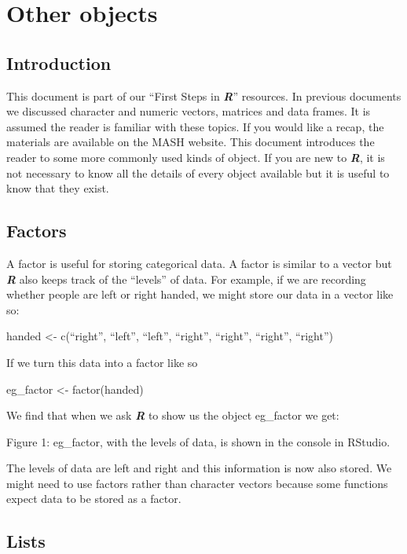 \documentclass[
]{book}
\begin{document}
\chapter{Other objects}\label{other-objects}

\section{Introduction}\label{introduction-6}

This document is part of our ``First Steps in \textbf{\emph{R}}'' resources. In previous documents we discussed character and numeric vectors, matrices and data frames. It is assumed the reader is familiar with these topics. If you would like a recap, the materials are available on the MASH website. This document introduces the reader to some more commonly used kinds of object. If you are new to \textbf{\emph{R}}, it is not necessary to know all the details of every object available but it is useful to know that they exist.

\section{Factors}\label{factors}

A factor is useful for storing categorical data. A factor is similar to a vector but \textbf{\emph{R}} also keeps track of the ``levels'' of data. For example, if we are recording whether people are left or right handed, we might store our data in a vector like so:

handed \textless- c(``right'', ``left'', ``left'', ``right'', ``right'', ``right'', ``right'')

If we turn this data into a factor like so

eg\_factor \textless- factor(handed)

We find that when we ask \textbf{\emph{R}} to show us the object eg\_factor we get:

Figure 1: eg\_factor, with the levels of data, is shown in the console in RStudio.

The levels of data are left and right and this information is now also stored. We might need to use factors rather than character vectors because some functions expect data to be stored as a factor.

\section{Lists}\label{lists}
\end{document}
